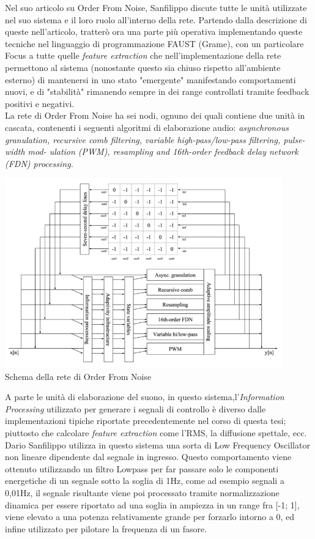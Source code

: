 Nel suo articolo su Order From Noise, Sanfilippo discute tutte le unità utilizzate
nel suo sistema e il loro ruolo all'interno della rete.
Partendo dalla descrizione di queste nell'articolo, tratterò ora una parte più operativa 
implementando queste tecniche nel linguaggio di programmazione FAUST (Grame), 
con un particolare Focus a tutte quelle \textit{feature extraction}
che nell'implementazione della rete permettono al sistema 
(nonostante questo sia chiuso rispetto all'ambiente esterno) 
di mantenersi in uno stato "emergente" manifestando comportamenti nuovi,
e di "stabilità" rimanendo sempre in dei range controllati tramite feedback positivi e negativi.\\
La rete di Order From Noise ha sei nodi, ognuno dei quali contiene due unità in cascata, 
contenenti i seguenti algoritmi di elaborazione audio: 
\textit{asynchronous granulation, recursive comb filtering, variable high-pass/low-pass filtering, pulse-width mod-
ulation (PWM), resampling and 16th-order feedback delay network (FDN) processing.}

\begin{center}
    \includegraphics[width=12cm]{figures/OFNnetwork.pdf} \\
    {Schema della rete di Order From Noise} \\ 
    \end{center}

A parte le unità di elaborazione del suono,
in questo sistema,l'\textit{Information Processing} utilizzato per generare i 
segnali di controllo è diverso
dalle implementazioni tipiche riportate precedentemente nel corso di questa tesi;
piuttosto che calcolare \textit{feature extraction} come l'RMS, la diffusione spettale, ecc. 
Dario Sanfilippo utilizza in questo sistema una sorta di Low Frequency Oscillator
non lineare dipendente dal segnale in ingresso.
Questo comportamento viene ottenuto utilizzando un filtro Lowpass per far 
passare solo le componenti energetiche di un segnale sotto la soglia di 1Hz,
come ad esempio segnali a 0,01Hz, il segnale risultante viene poi processato
tramite normalizzazione dinamica per essere riportato ad una soglia in ampiezza
in un range fra [-1; 1],
viene elevato a una potenza relativamente grande per forzarlo intorno a 0,
ed infine utilizzato per pilotare la frequenza di un fasore.\\

